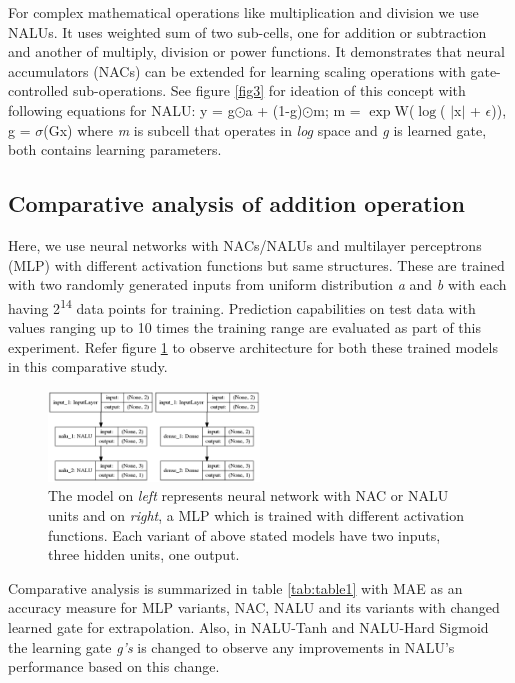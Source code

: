 \documentclass[conference]{IEEEtran}
\begin{document}
For complex mathematical operations like multiplication and division we use NALUs. It uses weighted sum of two sub-cells, one for addition or subtraction and another of multiply, division or power functions. It demonstrates that neural accumulators (NACs) can be extended for learning scaling operations with gate-controlled sub-operations. See figure \ref{fig3} for ideation of this concept with following equations for NALU: y = g$\odot$a + (1-g)$\odot$m; m = $\exp$W($\log$( $\mid$x$\mid$ + $\epsilon$)), g = $\sigma$(Gx) where \textit{m} is subcell that operates in \textit{log} space and \textit{g} is learned gate, both contains learning parameters.

\subsection{Comparative analysis of addition operation}

Here, we use neural networks with NACs/NALUs and multilayer perceptrons (MLP) with different activation functions but same structures. These are trained with two randomly generated inputs from uniform distribution \textit{a} and \textit{b} with each having 2\textsuperscript{14} data points for training. Prediction capabilities on test data with values ranging up to 10 times the training range are evaluated as part of this experiment. Refer figure \ref{fig4} to observe architecture for both these trained models in this comparative study.

\begin{figure}[!h]
\centering
\includegraphics[width=0.50\textwidth]{mlp-models.png}
\caption{The model on \textit{left} represents neural network with NAC or NALU units and on \textit{right}, a MLP which is trained with different activation functions. Each variant of above stated models have two inputs, three hidden units, one output.}
\label{fig4}
\end{figure}

Comparative analysis is summarized in table  \ref{tab:table1} with MAE as an accuracy measure for MLP variants, NAC, NALU and its variants with changed learned gate for extrapolation. Also, in NALU-Tanh and NALU-Hard Sigmoid the learning gate \textit{g's} is changed to observe any improvements in NALU's performance based on this change.
\end{document}
